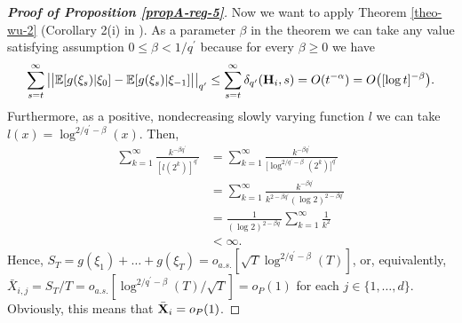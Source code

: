\documentclass[a4paper,12pt]{article}
\begin{document}
\begin{proof}[\textnormal{\textbf{Proof of Proposition \ref{propA-reg-5}}}]
Now we want to apply Theorem \ref{theo-wu-2} (Corollary 2(i) in \cite{Wu2007}). As a parameter $\beta$ in the theorem we can take any value satisfying assumption $0 \leq \beta < 1/{q^\prime}$ because for every $\beta \geq 0$ we have 
\begin{align*}
\sum_{s = t}^\infty \big|\big| \mathbb{E} [g(\xi_s)| \xi_0] - \mathbb{E} [g(\xi_s)| \xi_{-1}]\big|\big|_{q^\prime} \leq \sum_{s = t}^\infty \delta_{q^\prime}(\mathbf{H}_i, s) =O(t^{-\alpha}) = O\big([\log t]^{-\beta}\big).
\end{align*}
Furthermore, as a positive, nondecreasing slowly varying function $\mathit{l}$ we can take \linebreak $\mathit{l}(x) = \log^{2/{q^\prime} - \beta}(x)$. Then,
\begin{align*}
\sum_{k=1}^\infty \frac{k^{-\beta q^\prime}}{[l(2^k)]^{q^\prime}} &= \sum_{k=1}^\infty \frac{k^{-\beta  q^\prime}}{\big[\log^{2/{q^\prime} - \beta}(2^k)\big]^{q^\prime}} \\
&= \sum_{k=1}^\infty \frac{k^{-\beta  q^\prime}}{k^{2 -\beta q^\prime }(\log 2)^{2 - \beta q^\prime}} \\
&= \frac{1}{(\log 2)^{2 - \beta q^\prime}}\sum_{k=1}^\infty \frac{1}{k^2} \\
&< \infty.
\end{align*}
Hence, $S_T = g(\xi_1) + \ldots + g(\xi_T) = o_{a.s.}[\sqrt{T}\log^{2/{q^\prime} - \beta}(T)]$, or, equivalently, \linebreak $\bar{X}_{i, j} = S_T/T = o_{a.s.}[\log^{2/{q^\prime} - \beta}(T)/\sqrt{T}] = o_P(1)$ for each $j \in \{1, \ldots, d\}$. Obviously, this means that $\bar{\mathbf{X}}_i = o_P(1)$.
\end{proof}
\end{document}
